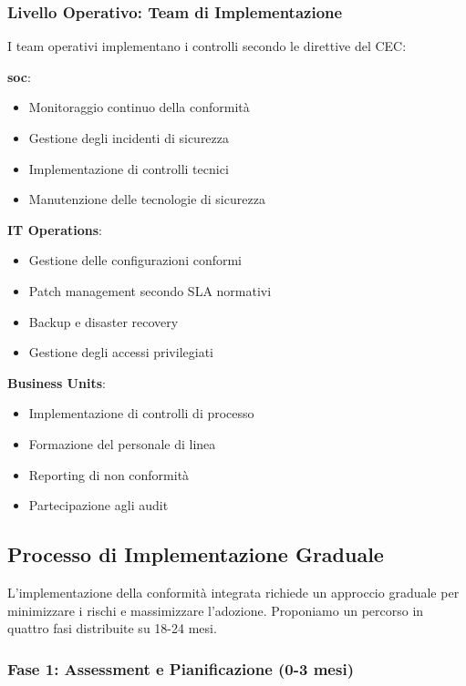 \subsubsection{\texorpdfstring{Livello Operativo: Team di Implementazione}{4.6.1.3 - Livello Operativo: Team di Implementazione}}

I team operativi implementano i controlli secondo le direttive del CEC:

\textbf{\gls{soc}}:
\begin{itemize}
    \item Monitoraggio continuo della conformità
    \item Gestione degli incidenti di sicurezza
    \item Implementazione di controlli tecnici
    \item Manutenzione delle tecnologie di sicurezza
\end{itemize}

\textbf{IT Operations}:
\begin{itemize}
    \item Gestione delle configurazioni conformi
    \item Patch management secondo SLA normativi
    \item Backup e disaster recovery
    \item Gestione degli accessi privilegiati
\end{itemize}

\textbf{Business Units}:
\begin{itemize}
    \item Implementazione di controlli di processo
    \item Formazione del personale di linea
    \item Reporting di non conformità
    \item Partecipazione agli audit
\end{itemize}

\subsection{\texorpdfstring{Processo di Implementazione Graduale}{4.6.2 - Processo di Implementazione Graduale}}
\label{subsec:4.6.2_implementazione}

L'implementazione della conformità integrata richiede un approccio graduale per minimizzare i rischi e massimizzare l'adozione. Proponiamo un percorso in quattro fasi distribuite su 18-24 mesi.

\subsubsection{\texorpdfstring{Fase 1: Assessment e Pianificazione (0-3 mesi)}{4.6.2.1 - Fase 1: Assessment e Pianificazione (0-3 mesi)}}

